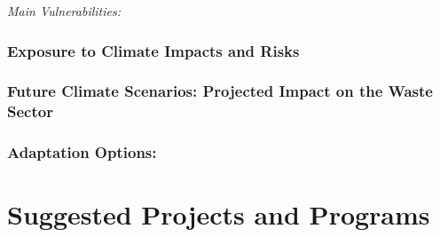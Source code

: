 \documentclass[
]{book}
\begin{document}
\emph{Main Vulnerabilities:}

\hypertarget{exposure-to-climate-impacts-and-risks-9}{%
\subsubsection{Exposure to Climate Impacts and Risks}\label{exposure-to-climate-impacts-and-risks-9}}

\hypertarget{future-climate-scenarios-projected-impact-on-the-waste-sector}{%
\subsubsection{Future Climate Scenarios: Projected Impact on the Waste Sector}\label{future-climate-scenarios-projected-impact-on-the-waste-sector}}

\hypertarget{adaptation-options-9}{%
\subsubsection{Adaptation Options:}\label{adaptation-options-9}}

\hypertarget{suggested-projects-and-programs}{%
\section{Suggested Projects and Programs}\label{suggested-projects-and-programs}}

  
\end{document}
